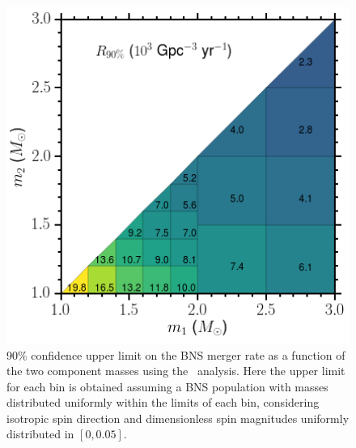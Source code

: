 \begin{figure}[t]
\centering
\includegraphics[width=1.0\textwidth]{figs/chapter3/figure4.png}
\caption{\label{fig:bns_ul_vs_mass} 90\% confidence upper limit on the \ac{BNS} merger rate as a function of the two component
masses using the \pycbc\ analysis. Here the upper limit for each bin is obtained assuming a \ac{BNS} population with masses distributed uniformly
within the limits of each bin, considering isotropic spin direction and dimensionless spin magnitudes uniformly
distributed in $[0, 0.05]$.}
\end{figure}

